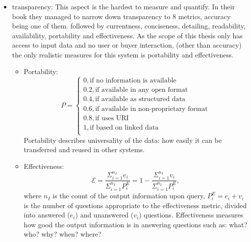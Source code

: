 \documentclass[english, 12pt, a4paper, sci, utf8, a-2b, online]{aaltothesis}
\theoremstyle{change}
\theoremstyle{theoremstyle}
\begin{document}
\begin{itemize}
    \item transparency: This aspect is the hardest to measure and quantify. In their book  \cite{spagnuelo2016metrics} they managed to narrow down transparency to 8 metrics, accuracy being one of them. followed by currentness, conciseness, detailing, readability, availability, portability and effectiveness. As the scope of this thesis only has access to input data and no user or buyer interaction, (other than accuracy) the only realistic measures for this system is portability and effectiveness. %
    \begin{itemize}
        \item Portability:
        \begin{equation*}
            P = \begin{cases}
                0, \text{if no information is available}\\
                0.2, \text{if available in any open format}\\
                0.4, \text{if available as structured data}\\
                0.6, \text{if available in non-proprietary format}\\
                0.8, \text{if uses URI}\\
                1, \text{if based on linked data}\\
            \end{cases}
        \end{equation*}
        Portability describes universality of the data: how easily it can be transferred and reused in other systems.
        \item Effectiveness:
        \begin{equation*}
            \mathcal{E} = \frac{\Sigma^{n_I}_{i=1}e_i}{\Sigma^{n_I}_{i=1}P^E_i} = 1 - \frac{\Sigma^{n_I}_{i=1}v_i}{\Sigma^{n_I}_{i=1}P^E_i},
        \end{equation*}
        where $n_I$ is the count of the output information upon query, $P^E_i = e_i + v_i$ is the number of questions appropriate to the effectiveness metric, divided into answered ($e_i$) and unanswered ($v_i$) questions.
        Effectiveness measures how good the output information is in answering questions such as: what? who? why? when? where?
    \end{itemize}
\end{itemize}
\end{document}
